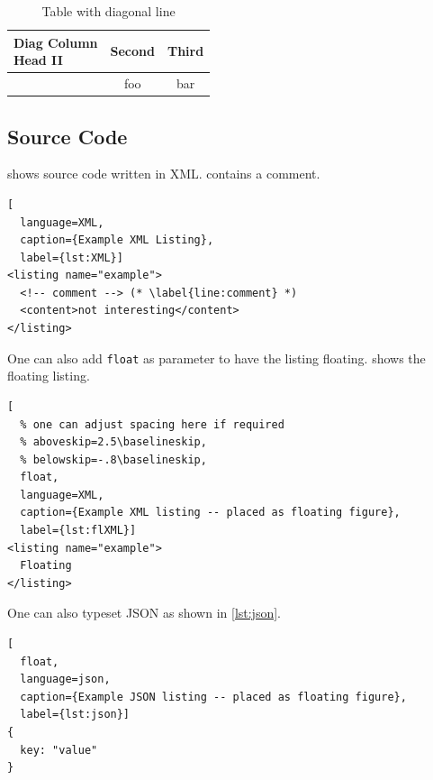 \begin{ltgexample}
\begin{table}
  \caption{Table with diagonal line}
  \label{tab:diag}
  \begin{center}
    \begin{tabular}{|l|c|c|}
      \hline
      \diagbox[width=10em]{Diag \\Column Head I}{Diag Column\\Head II} & Second & Third \\
      \hline
       & foo & bar              \\
      \hline
    \end{tabular}
  \end{center}
\end{table}
\end{ltgexample}


\subsection{Source Code}

\begin{ltgexample}
 shows source code written in XML.
 contains a comment.

\begin{lstlisting}[
  language=XML,
  caption={Example XML Listing},
  label={lst:XML}]
<listing name="example">
  <!-- comment --> (* \label{line:comment} *)
  <content>not interesting</content>
</listing>
\end{lstlisting}
\end{ltgexample}

One can also add \verb+float+ as parameter to have the listing floating.
 shows the floating listing.

\begin{ltgexample}
\begin{lstlisting}[
  % one can adjust spacing here if required
  % aboveskip=2.5\baselineskip,
  % belowskip=-.8\baselineskip,
  float,
  language=XML,
  caption={Example XML listing -- placed as floating figure},
  label={lst:flXML}]
<listing name="example">
  Floating
</listing>
\end{lstlisting}
\end{ltgexample}

One can also typeset JSON as shown in \cref{lst:json}.

\begin{ltgexample}
\begin{lstlisting}[
  float,
  language=json,
  caption={Example JSON listing -- placed as floating figure},
  label={lst:json}]
{
  key: "value"
}
\end{lstlisting}
\end{ltgexample}

